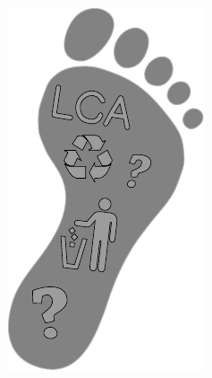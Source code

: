 \documentclass[a0paper,fleqn]{betterposter}
\begin{document}
{{        \begin{minipage}{0.4\textwidth}
        \begin{flushleft}
            \vspace{10pt}
            \includegraphics[width=\textwidth]{img/foot.pdf}
        \end{flushleft}
        \end{minipage}
        \vspace{50pt}

}}
\end{document}
